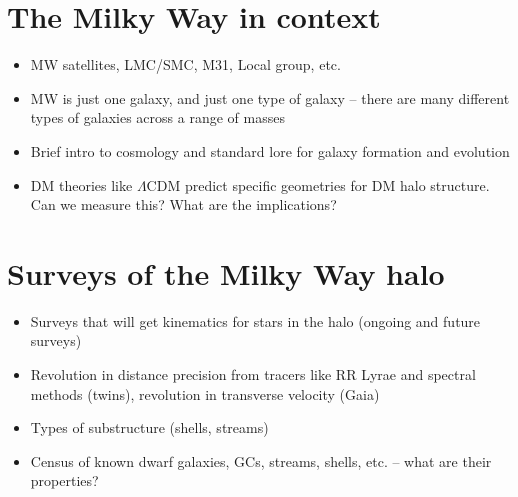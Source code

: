 \section{The Milky Way in context}\label{sec:milkyway-context}

\begin{itemize}
	\item MW satellites, LMC/SMC, M31, Local group, etc.
	\item MW is just one galaxy, and just one type of galaxy -- there are many different types of galaxies across a range of masses
	\item Brief intro to cosmology and standard lore for galaxy formation and evolution
	\item DM theories like $\Lambda$CDM predict specific geometries for DM halo structure. Can we measure this? What are the implications?
\end{itemize}

\section{Surveys of the Milky Way halo}\label{sec:surveys}

\begin{itemize}
	\item Surveys that will get kinematics for stars in the halo (ongoing and future surveys)
	\item Revolution in distance precision from tracers like RR Lyrae and spectral methods (twins), revolution in transverse velocity (Gaia)
	\item Types of substructure (shells, streams)
	\item Census of known dwarf galaxies, GCs, streams, shells, etc. -- what are their properties?
\end{itemize}


